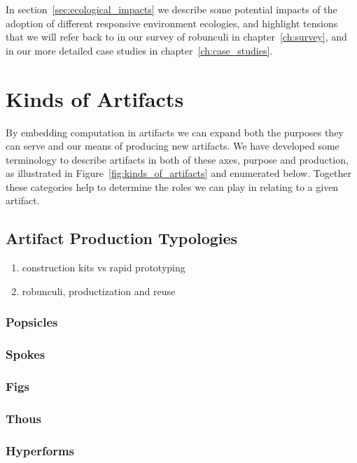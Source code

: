 In section~\ref{sec:ecological_impacts} we describe some potential impacts of the adoption of different responsive environment ecologies, and highlight tensions that we will refer back to in our survey of robunculi in chapter~\ref{ch:survey}, and in our more detailed case studies in chapter~\ref{ch:case_studies}.

\section{Kinds of Artifacts}
\label{sec:kinds_of_artifacts}
%
By embedding computation in artifacts we can expand both the purposes they can serve and our means of producing new artifacts. 
We have developed some terminology to describe artifacts in both of these axes, purpose and production, as illustrated in Figure~\ref{fig:kinds_of_artifacts} and enumerated below. 
Together these categories help to determine the roles we can play in relating to a given artifact.

\subsection{Artifact Production Typologies}
%

    \begin{enumerate}
        \item construction kits vs rapid prototyping
        \item robunculi, productization and reuse
    \end{enumerate}

\subsubsection{Popsicles}

\subsubsection{Spokes}

\subsubsection{Figs}

\subsubsection{Thous}

\subsubsection{Hyperforms}


